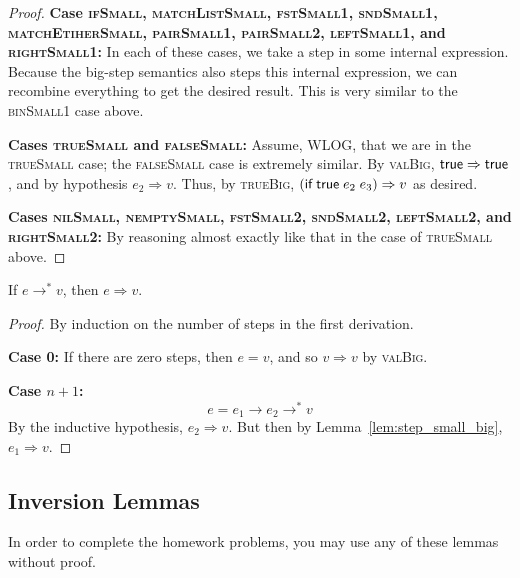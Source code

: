 \documentclass{homework}
\begin{document}
\begin{proof}
  \vspace{0.5em}\noindent\textbf{Case \textsc{ifSmall}, \textsc{matchListSmall}, \textsc{fstSmall1}, \textsc{sndSmall1}, \textsc{matchEtiherSmall}, \textsc{pairSmall1}, \textsc{pairSmall2}, \textsc{leftSmall1}, and \textsc{rightSmall1}:}
  In each of these cases, we take a step in some internal expression.
  Because the big-step semantics also steps this internal expression, we can recombine everything to get the desired result.
  This is very similar to the \textsc{binSmall1} case above.

  \vspace{0.5em}\noindent\textbf{Cases \textsc{trueSmall} and \textsc{falseSmall}:}
  Assume, WLOG, that we are in the \textsc{trueSmall} case; the \textsc{falseSmall} case is extremely similar.
  By \textsc{valBig}, $\textsf{true} \Rightarrow \textsf{true}$, and by hypothesis $e_2 \Rightarrow v$.
  Thus, by \textsc{trueBig}, $(\textsf{if}\;\textsf{true}\;e_2\;e_3) \Rightarrow v$ as desired.

  \vspace{0.5em}\noindent\textbf{Cases \textsc{nilSmall}, \textsc{nemptySmall}, \textsc{fstSmall2}, \textsc{sndSmall2}, \textsc{leftSmall2}, and \textsc{rightSmall2}:}
  By reasoning almost exactly like that in the case of \textsc{trueSmall} above.
\end{proof}

\begin{thm}
  If $e \to^\ast v$, then $e \Rightarrow v$.
\end{thm}
\begin{proof}
  By induction on the number of steps in the first derivation.

  \vspace{0.5em}\noindent\textbf{Case 0:}
  If there are zero steps, then $e = v$, and so $v \Rightarrow v$ by \textsc{valBig}.

  \vspace{0.5em}\noindent\textbf{Case $n + 1$:}
  $$e = e_1 \to e_2 \to^\ast v$$
  By the inductive hypothesis, $e_2 \Rightarrow v$.
  But then by Lemma~\ref{lem:step_small_big}, $e_1 \Rightarrow v$.
\end{proof}

\subsection{Inversion Lemmas}
In order to complete the homework problems, you may use any of these lemmas without proof.
\end{document}
